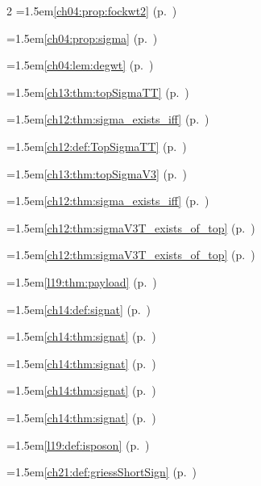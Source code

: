 \begin{multicols}{2}
\hangindent=1.5em\quad \ref{ch04:prop:fockwt2} (p.~\pageref{ch04:prop:fockwt2})\par
\hangindent=1.5em\quad \ref{ch04:prop:sigma} (p.~\pageref{ch04:prop:sigma})\par
\hangindent=1.5em\quad \ref{ch04:lem:degwt} (p.~\pageref{ch04:lem:degwt})\par
\hangindent=1.5em\quad \ref{ch13:thm:topSigmaTT} (p.~\pageref{ch13:thm:topSigmaTT})\par
\hangindent=1.5em\quad \ref{ch12:thm:sigma_exists_iff} (p.~\pageref{ch12:thm:sigma_exists_iff})\par
\hangindent=1.5em\quad \ref{ch12:def:TopSigmaTT} (p.~\pageref{ch12:def:TopSigmaTT})\par
\hangindent=1.5em\quad \ref{ch13:thm:topSigmaV3} (p.~\pageref{ch13:thm:topSigmaV3})\par
\hangindent=1.5em\quad \ref{ch12:thm:sigma_exists_iff} (p.~\pageref{ch12:thm:sigma_exists_iff})\par
\hangindent=1.5em\quad \ref{ch12:thm:sigmaV3T_exists_of_top} (p.~\pageref{ch12:thm:sigmaV3T_exists_of_top})\par
\hangindent=1.5em\quad \ref{ch12:thm:sigmaV3T_exists_of_top} (p.~\pageref{ch12:thm:sigmaV3T_exists_of_top})\par
\hangindent=1.5em\quad \ref{l19:thm:payload} (p.~\pageref{l19:thm:payload})\par
\hangindent=1.5em\quad \ref{ch14:def:signat} (p.~\pageref{ch14:def:signat})\par
\hangindent=1.5em\quad \ref{ch14:thm:signat} (p.~\pageref{ch14:thm:signat})\par
\hangindent=1.5em\quad \ref{ch14:thm:signat} (p.~\pageref{ch14:thm:signat})\par
\hangindent=1.5em\quad \ref{ch14:thm:signat} (p.~\pageref{ch14:thm:signat})\par
\hangindent=1.5em\quad \ref{ch14:thm:signat} (p.~\pageref{ch14:thm:signat})\par
\hangindent=1.5em\quad \ref{l19:def:isposon} (p.~\pageref{l19:def:isposon})\par
\hangindent=1.5em\quad \ref{ch21:def:griessShortSign} (p.~\pageref{ch21:def:griessShortSign})\par

\end{multicols}
